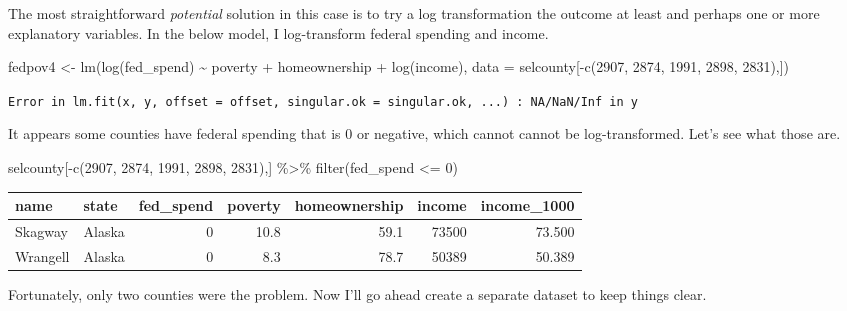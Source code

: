 \documentclass[
]{book}
\makeatletter
\newenvironment{Shaded}{\begin{snugshade}}{\end{snugshade}}
\newcommand{\AttributeTok}[1]{\textcolor[rgb]{0.61,0.61,0.61}{#1}}
\newcommand{\DecValTok}[1]{\textcolor[rgb]{0.06,0.06,0.06}{#1}}
\newcommand{\FunctionTok}[1]{\textcolor[rgb]{0,0,0}{#1}}
\newcommand{\NormalTok}[1]{#1}
\newcommand{\OtherTok}[1]{\textcolor[rgb]{0.37,0.37,0.37}{#1}}
\newcommand{\SpecialCharTok}[1]{\textcolor[rgb]{0,0,0}{#1}}
\newenvironment{kframe}{%
\medskip{}
\setlength{\fboxsep}{.8em}
 \def\at@end@of@kframe{}%
 \ifinner\ifhmode%
  \def\at@end@of@kframe{\end{minipage}}%
  \begin{minipage}{\columnwidth}%
 \fi\fi%
 \def\FrameCommand##1{\hskip\@totalleftmargin \hskip-\fboxsep
 \colorbox{shadecolor}{##1}\hskip-\fboxsep
     \hskip-\linewidth \hskip-\@totalleftmargin \hskip\columnwidth}%
 \MakeFramed {\advance\hsize-\width
   \@totalleftmargin\z@ \linewidth\hsize
   \@setminipage}}%
 {\par\unskip\endMakeFramed%
 \at@end@of@kframe}
\renewenvironment{Shaded}{\begin{kframe}}{\end{kframe}}
\makeatother
\begin{document}
The most straightforward \emph{potential} solution in this case is to try a log transformation the outcome at least and perhaps one or more explanatory variables. In the below model, I log-transform federal spending and income.

\begin{Shaded}
\begin{Highlighting}[]
\NormalTok{fedpov4 }\OtherTok{\textless{}{-}} \FunctionTok{lm}\NormalTok{(}\FunctionTok{log}\NormalTok{(fed\_spend) }\SpecialCharTok{\textasciitilde{}}\NormalTok{ poverty }\SpecialCharTok{+}\NormalTok{ homeownership }\SpecialCharTok{+} \FunctionTok{log}\NormalTok{(income), }
              \AttributeTok{data =}\NormalTok{ selcounty[}\SpecialCharTok{{-}}\FunctionTok{c}\NormalTok{(}\DecValTok{2907}\NormalTok{, }\DecValTok{2874}\NormalTok{, }\DecValTok{1991}\NormalTok{, }\DecValTok{2898}\NormalTok{, }\DecValTok{2831}\NormalTok{),])}
\end{Highlighting}
\end{Shaded}

\texttt{Error\ in\ lm.fit(x,\ y,\ offset\ =\ offset,\ singular.ok\ =\ singular.ok,\ ...)\ :\ NA/NaN/Inf\ in\ \textquotesingle{}y\textquotesingle{}}

It appears some counties have federal spending that is 0 or negative, which cannot cannot be log-transformed. Let's see what those are.

\begin{Shaded}
\begin{Highlighting}[]
\NormalTok{selcounty[}\SpecialCharTok{{-}}\FunctionTok{c}\NormalTok{(}\DecValTok{2907}\NormalTok{, }\DecValTok{2874}\NormalTok{, }\DecValTok{1991}\NormalTok{, }\DecValTok{2898}\NormalTok{, }\DecValTok{2831}\NormalTok{),] }\SpecialCharTok{\%\textgreater{}\%} 
  \FunctionTok{filter}\NormalTok{(fed\_spend }\SpecialCharTok{\textless{}=} \DecValTok{0}\NormalTok{)}
\end{Highlighting}
\end{Shaded}

\begin{tabular}{l|l|r|r|r|r|r}
\hline
name & state & fed\_spend & poverty & homeownership & income & income\_1000\\
\hline
Skagway & Alaska & 0 & 10.8 & 59.1 & 73500 & 73.500\\
\hline
Wrangell & Alaska & 0 & 8.3 & 78.7 & 50389 & 50.389\\
\hline
\end{tabular}

Fortunately, only two counties were the problem. Now I'll go ahead create a separate dataset to keep things clear.
\end{document}
